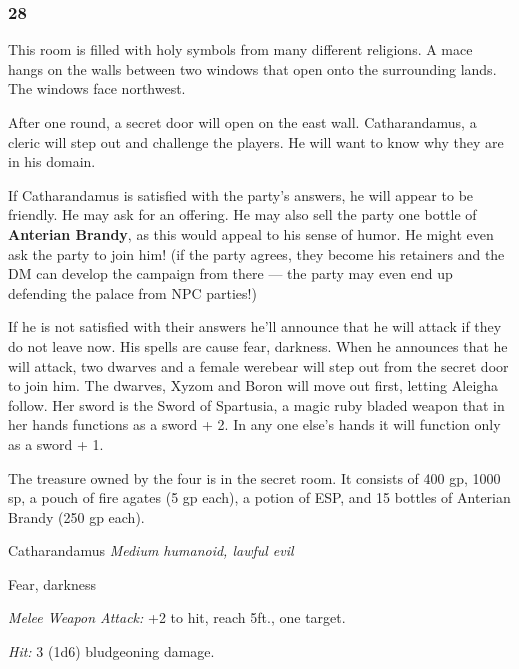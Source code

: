 \documentclass[palace_of_the_silver_princess]{subfiles}
\begin{document}
\subsubsection{28}
\begin{quotebox}
    This room is filled with holy symbols from many different religions.
    A mace hangs on the walls between two windows that open onto the
    surrounding lands. The windows face northwest.
\end{quotebox}

After one round, a secret door will open on the east wall.
Catharandamus, a cleric will step out and challenge the players. He will
want to know why they are in his domain.

If Catharandamus is satisfied with the party’s answers, he will appear
to be friendly. He may ask for an offering. He may also sell the party
one bottle of \textbf{Anterian Brandy}, as this would appeal to his
sense of humor. He might even ask the party to join him!  (if the party
agrees, they become his retainers and the DM can develop the campaign
from there — the party may even end up defending the palace from NPC
parties!)

If he is not satisfied with their answers he’ll announce that he will
attack if they do not leave now. His spells are cause fear, darkness.
When he announces that he will attack, two dwarves and a female werebear
will step out from the secret door to join him. The dwarves, Xyzom
and Boron will move out first, letting Aleigha follow.  Her sword is the
Sword of Spartusia, a magic ruby bladed weapon that in her hands
functions as a sword + 2. In any one else's hands it will function only
as a sword + 1. 

The treasure owned by the four is in the secret room. It consists of
400 gp, 1000 sp, a pouch of fire agates (5 gp each), a potion of ESP,
and 15 bottles of Anterian Brandy (250 gp each).

\begin{monsterbox}{Catharandamus}
	\textit{Medium humanoid, lawful evil}\\
	\hline
	\basics[
		armorclass = {13},
		hitpoints = {27 (5d8 + 5)},
		speed = {25~ft.}]
	\hline
	\stats[
		STR = \stat{10},
		DEX = \stat{10},
		CON = \stat{12},
		INT = \stat{13},
		WIS = \stat{16},
		CHA = \stat{13}]
	\hline
	\details[
        skills = {Medicine +7, Persuasion +3, Religion +4},
		senses = {passive Perception 13},
        languages = {Common, Dwarvish},
		challenge = {2 (450 XP)}]
	\hline
    \begin{monsteraction}[Cantrips]
        Fear, darkness
    \end{monsteraction}


    \begin{monsteraction}[Mace]
        \textit{Melee Weapon Attack:} +2 to hit, reach 5ft., one target. 

        \textit{Hit:} 3 (1d6) bludgeoning damage.
    \end{monsteraction}
\end{monsterbox}
\end{document}
